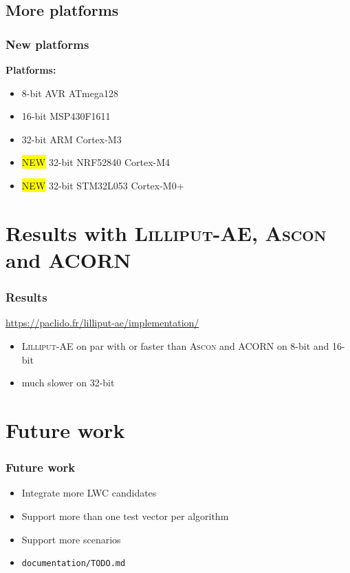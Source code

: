 \documentclass[english]{beamer}
\newcommand{\bgyellow}[1]{\colorbox{yellow}{#1}}
\begin{document}
\subsection{More platforms}

\begin{frame}
  \frametitle{New platforms}

  \textbf{Platforms:}
  \begin{itemize}
  \item 8-bit AVR ATmega128
  \item 16-bit MSP430F1611
  \item 32-bit ARM Cortex-M3
    \pause
  \item \bgyellow{NEW} 32-bit NRF52840 Cortex-M4
  \item \bgyellow{NEW} 32-bit STM32L053 Cortex-M0+
  \end{itemize}

\end{frame}

\section[Results]{Results with \textsc{Lilliput-AE}, \textsc{Ascon} and ACORN}

\begin{frame}
  \frametitle{Results}

  \url{https://paclido.fr/lilliput-ae/implementation/}

  \begin{itemize}
  \item \textsc{Lilliput-AE} on par with or faster than \textsc{Ascon} and ACORN on 8-bit and 16-bit
  \item much slower on 32-bit
  \end{itemize}

\end{frame}

\section[Future work]{Future work}

\begin{frame}
  \frametitle{Future work}

  \begin{itemize}
  \item Integrate more LWC candidates
  \item Support more than one test vector per algorithm
  \item Support more scenarios
  \item \texttt{documentation/TODO.md}
  \end{itemize}

\end{frame}
\end{document}
